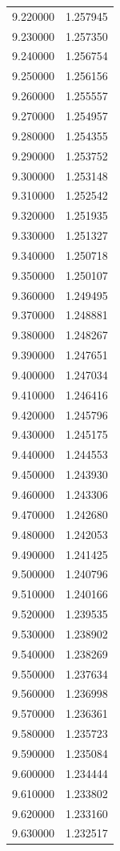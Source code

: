 \begin{tabular}{rr}
9.220000 & 1.257945 \\
9.230000 & 1.257350 \\
9.240000 & 1.256754 \\
9.250000 & 1.256156 \\
9.260000 & 1.255557 \\
9.270000 & 1.254957 \\
9.280000 & 1.254355 \\
9.290000 & 1.253752 \\
9.300000 & 1.253148 \\
9.310000 & 1.252542 \\
9.320000 & 1.251935 \\
9.330000 & 1.251327 \\
9.340000 & 1.250718 \\
9.350000 & 1.250107 \\
9.360000 & 1.249495 \\
9.370000 & 1.248881 \\
9.380000 & 1.248267 \\
9.390000 & 1.247651 \\
9.400000 & 1.247034 \\
9.410000 & 1.246416 \\
9.420000 & 1.245796 \\
9.430000 & 1.245175 \\
9.440000 & 1.244553 \\
9.450000 & 1.243930 \\
9.460000 & 1.243306 \\
9.470000 & 1.242680 \\
9.480000 & 1.242053 \\
9.490000 & 1.241425 \\
9.500000 & 1.240796 \\
9.510000 & 1.240166 \\
9.520000 & 1.239535 \\
9.530000 & 1.238902 \\
9.540000 & 1.238269 \\
9.550000 & 1.237634 \\
9.560000 & 1.236998 \\
9.570000 & 1.236361 \\
9.580000 & 1.235723 \\
9.590000 & 1.235084 \\
9.600000 & 1.234444 \\
9.610000 & 1.233802 \\
9.620000 & 1.233160 \\
9.630000 & 1.232517 \\

\end{tabular}
